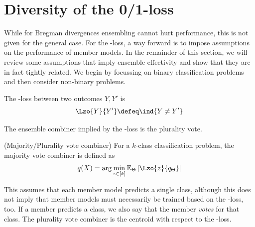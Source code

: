\documentclass[../main.tex]{subfiles}
\begin{document}


\section{Diversity of the 0/1-loss}
\label{sec:diversity-zeroone}

While for Bregman divergences ensembling cannot hurt performance, this is not given for the general case. For the \zeroone-loss, a way forward is to impose assumptions on the performance of member models.
In the remainder of this section, we will review some assumptions that imply ensemble effectivity and show that they are in fact tightly related. We begin by focussing on binary classification problems and then consider non-binary problems.


\begin{definition}
\label{def:zeroone-loss}
The \zeroone-loss between two outcomes $Y, Y'$ is 
$$
\Lzo{Y}{Y'} \defeq \ind{Y \not= Y'}
$$
\end{definition}

The ensemble combiner implied by the \zeroone-loss is the plurality vote.
\begin{definition} 
   \label{def:majority-vote} 
    (Majority/Plurality vote combiner) For a $k$-class classification problem, the majority vote combiner is defined as
$$
\bar{q}(X) = \arg\min_{z \in [k]} \mathbb{E}_{\Theta}\left[ \Lzo{z}{q_{\Theta}} \right]  
$$
\end{definition}
This assumes that each member model predicts a single class, although this does not imply that member models must necessarily be trained based on the \zeroone-loss, too. If a member predicts a class, we also say that the member \textit{votes} for that class.
The plurality vote combiner is the centroid with respect to the \zeroone-loss.
\end{document}
